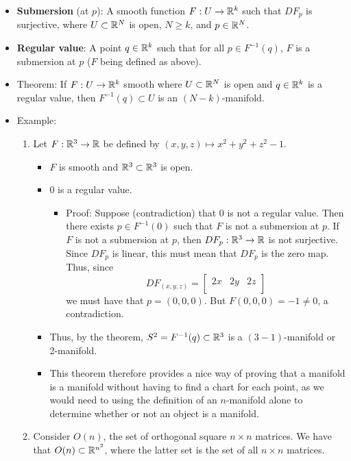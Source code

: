 \documentclass[../notes.tex]{subfiles}
\begin{document}
\begin{itemize}
    \item \textbf{Submersion} (at $p$): A smooth function $F:U\to\mathbb{R}^k$ such that $DF_p$ is surjective, where $U\subset\mathbb{R}^N$ is open, $N\geq k$, and $p\in\mathbb{R}^N$.
    \item \textbf{Regular value}: A point $q\in\mathbb{R}^k$ such that for all $p\in F^{-1}(q)$, $F$ is a submersion at $p$ ($F$ being defined as above).
    \item Theorem: If $F:U\to\mathbb{R}^k$ smooth where $U\subset\mathbb{R}^N$ is open and $q\in\mathbb{R}^k$ is a regular value, then $F^{-1}(q)\subset U$ is an $(N-k)$-manifold.
    \item Example:
    \begin{enumerate}
        \item Let $F:\mathbb{R}^3\to\mathbb{R}$ be defined by $(x,y,z)\mapsto x^2+y^2+z^2-1$.
        \begin{itemize}
            \item $F$ is smooth and $\mathbb{R}^3\subset\mathbb{R}^3$ is open.
            \item 0 is a regular value.
            \begin{itemize}
                \item Proof: Suppose (contradiction) that 0 is not a regular value. Then there exists $p\in F^{-1}(0)$ such that $F$ is not a submersion at $p$. If $F$ is not a submersion at $p$, then $DF_p:\mathbb{R}^3\to\mathbb{R}$ is not surjective. Since $DF_p$ is linear, this must mean that $DF_p$ is the zero map. Thus, since
                \begin{equation*}
                    DF_{(x,y,z)} =
                    \begin{bmatrix}
                        2x & 2y & 2z\\
                    \end{bmatrix}
                \end{equation*}
                we must have that $p=(0,0,0)$. But $F(0,0,0)=-1\neq 0$, a contradiction.
            \end{itemize}
            \item Thus, by the theorem, $S^2=F^{-1}(q)\subset\mathbb{R}^3$ is a $(3-1)$-manifold or 2-manifold.
            \item This theorem therefore provides a nice way of proving that a manifold is a manifold without having to find a chart for each point, as we would need to using the definition of an $n$-manifold alone to determine whether or not an object is a manifold.
        \end{itemize}
        \item Consider $O(n)$, the set of orthogonal square $n\times n$ matrices. We have that $O(n)\subset\mathbb{R}^{n^2}$, where the latter set is the set of all $n\times n$ matrices.

\end{enumerate}
\end{itemize}
\end{document}
